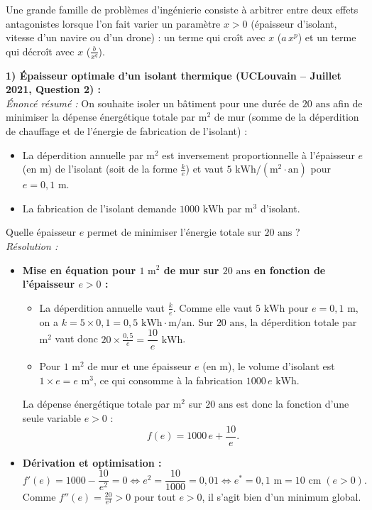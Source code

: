 Une grande famille de problèmes d'ingénierie consiste à arbitrer entre deux effets antagonistes lorsque l'on fait varier un paramètre $x > 0$ (épaisseur d'isolant, vitesse d'un navire ou d'un drone) : un terme qui croît avec $x$ ($a\,x^p$) et un terme qui décroît avec $x$ ($\frac{b}{x^q}$).

\begin{exemple}
\textbf{1) Épaisseur optimale d'un isolant thermique (UCLouvain -- Juillet 2021, Question 2) :}\\
\emph{Énoncé résumé :} On souhaite isoler un bâtiment pour une durée de $20\text{ ans}$ afin de minimiser la dépense énergétique totale par $\text{m}^2$ de mur (somme de la déperdition de chauffage et de l'énergie de fabrication de l'isolant) :
\begin{itemize}
    \item La déperdition annuelle par $\text{m}^2$ est inversement proportionnelle à l'épaisseur $e$ (en m) de l'isolant (soit de la forme $\frac{k}{e}$) et vaut $5\text{ kWh}/(\text{m}^2\cdot\text{an})$ pour $e = 0,1\text{ m}$.
    \item La fabrication de l'isolant demande $1000\text{ kWh}$ par $\text{m}^3$ d'isolant.
\end{itemize}
Quelle épaisseur $e$ permet de minimiser l'énergie totale sur $20\text{ ans}$ ?\\
\emph{Résolution :}
\begin{itemize}
    \item \textbf{Mise en équation pour $1\text{ m}^2$ de mur sur $20\text{ ans}$ en fonction de l'épaisseur $e > 0$ :}
    \begin{itemize}
        \item La déperdition annuelle vaut $\frac{k}{e}$. Comme elle vaut $5\text{ kWh}$ pour $e = 0,1\text{ m}$, on a $k = 5 \times 0,1 = 0,5\text{ kWh}\cdot\text{m/an}$. Sur $20\text{ ans}$, la déperdition totale par $\text{m}^2$ vaut donc $20 \times \frac{0,5}{e} = \dfrac{10}{e}\text{ kWh}$.
        \item Pour $1\text{ m}^2$ de mur et une épaisseur $e$ (en m), le volume d'isolant est $1 \times e = e\text{ m}^3$, ce qui consomme à la fabrication $1000\,e\text{ kWh}$.
    \end{itemize}
    La dépense énergétique totale par $\text{m}^2$ sur $20\text{ ans}$ est donc la fonction d'une seule variable $e > 0$ :
    \[
        f(e) = 1000\,e + \frac{10}{e}.
    \]
    \item \textbf{Dérivation et optimisation :}
    \[
        f'(e) = 1000 - \frac{10}{e^2} = 0 \iff e^2 = \frac{10}{1000} = 0,01 \iff \boxed{e^* = 0,1\text{ m} = 10\text{ cm}} \; (e > 0).
    \]
    Comme $f''(e) = \frac{20}{e^3} > 0$ pour tout $e > 0$, il s'agit bien d'un minimum global.
\end{itemize}


\end{exemple}
